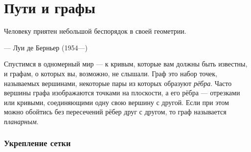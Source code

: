 \chapter{Пути и графы}

\setlength{\epigraphwidth}{.53\textwidth}
\epigraph{Человеку приятен небольшой беспорядок в своей геометрии.}{--- Луи де Берньер (1954---)}





Спустимся в одномерный мир --- к кривым, которые вам должны быть известны, и графам, о которых вы, возможно, не слышали.
Граф это набор точек, называемых вершинами, некоторые пары из которых образуют \emph{рёбра}.
Часто вершины графа изображаются точками на плоскости, а его рёбра — отрезками или кривыми, соединяющими одну свою вершину с другой.
Если при этом можно обойтись без пересечений рёбер друг с другом, то граф называется \emph{планарным}.

\subsection*{Укрепление сетки}

